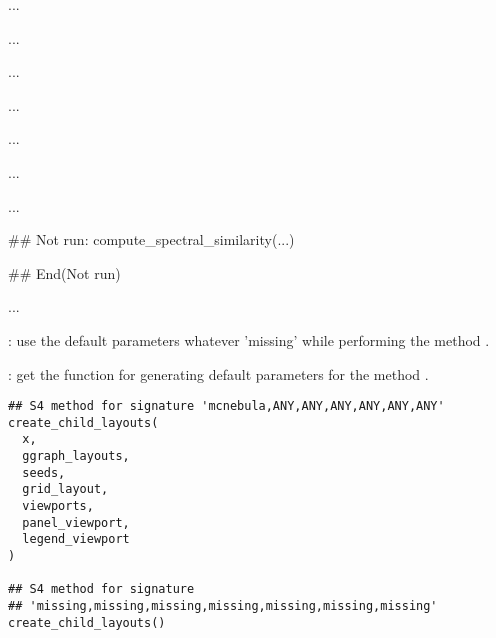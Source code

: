 \documentclass[letterpaper]{book}
\begin{document}
%
\begin{Arguments}
\begin{ldescription}
\item[\code{x}] ...

\item[\code{within\_nebula}] ...

\item[\code{recompute}] ...

\item[\code{sp1}] ...

\item[\code{sp2}] ...
\end{ldescription}
\end{Arguments}
%
\begin{Details}\relax
...
\end{Details}
%
\begin{Value}
...
\end{Value}
%
\begin{SeeAlso}\relax
{}
\end{SeeAlso}
%
\begin{Examples}
\begin{ExampleCode}
## Not run: 
compute_spectral_similarity(...)

## End(Not run)
\end{ExampleCode}
\end{Examples}
%
\begin{Description}\relax
...

: use the default parameters whatever 'missing'
while performing the method .

: get the function for generating
default parameters for the method
.
\end{Description}
%
\begin{Usage}
\begin{verbatim}
## S4 method for signature 'mcnebula,ANY,ANY,ANY,ANY,ANY,ANY'
create_child_layouts(
  x,
  ggraph_layouts,
  seeds,
  grid_layout,
  viewports,
  panel_viewport,
  legend_viewport
)

## S4 method for signature 
## 'missing,missing,missing,missing,missing,missing,missing'
create_child_layouts()
\end{verbatim}
\end{Usage}
\end{document}
